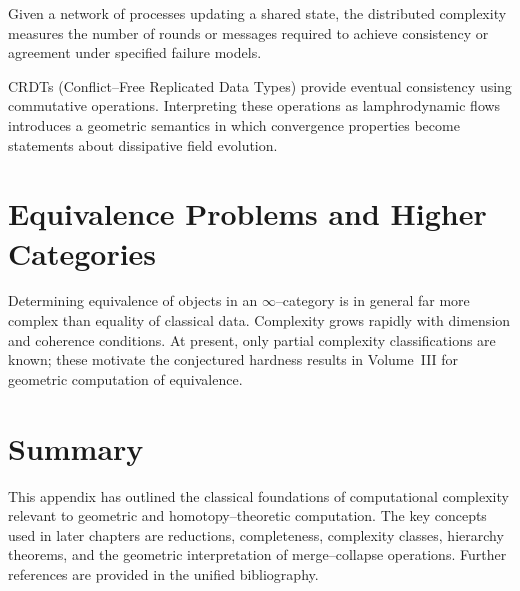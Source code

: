 \begin{definition}
Given a network of processes updating a shared state, the distributed
complexity measures the number of rounds or messages required to achieve
consistency or agreement under specified failure models.
\end{definition}

\begin{remark}
CRDTs (Conflict--Free Replicated Data Types) provide eventual consistency using
commutative operations.  Interpreting these operations as lamphrodynamic flows
introduces a geometric semantics in which convergence properties become
statements about dissipative field evolution.
\end{remark}

\section{Equivalence Problems and Higher Categories}

\begin{remark}
Determining equivalence of objects in an $\infty$--category is in general far
more complex than equality of classical data.  Complexity grows rapidly with
dimension and coherence conditions.  At present, only partial complexity
classifications are known; these motivate the conjectured hardness results in
Volume~III for geometric computation of equivalence.
\end{remark}

\section{Summary}

This appendix has outlined the classical foundations of computational
complexity relevant to geometric and homotopy--theoretic computation.  The key
concepts used in later chapters are reductions, completeness, complexity
classes, hierarchy theorems, and the geometric interpretation of
merge--collapse operations.  Further references are provided in the unified
bibliography.


